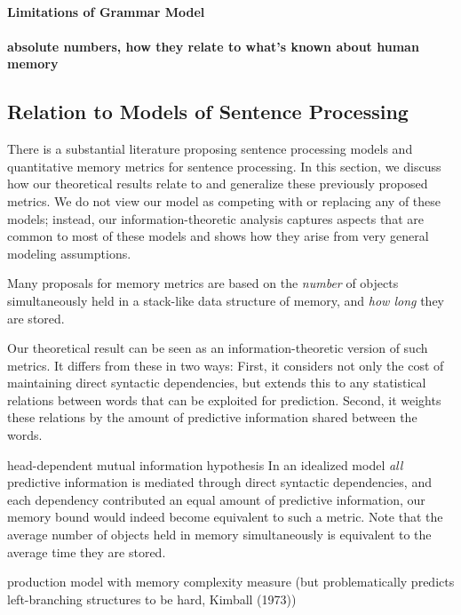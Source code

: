 \paragraph{Limitations of Grammar Model}

\paragraph{absolute numbers, how they relate to what's known about human memory}

\subsection{Relation to Models of Sentence Processing}

There is a substantial literature proposing sentence processing models and quantitative memory metrics for sentence processing.
In this section, we discuss how our theoretical results relate to and generalize these previously proposed metrics.
We do not view our model as competing with or replacing any of these models; instead, our information-theoretic analysis captures aspects that are common to most of these models and shows how they arise from very general modeling assumptions.

Many proposals for memory metrics are based on the \emph{number} of objects simultaneously held in a stack-like data structure of memory, and \emph{how long} they are stored.

Our theoretical result can be seen as an information-theoretic version of such metrics.
It differs from these in two ways:
First, it considers not only the cost of maintaining direct syntactic dependencies, but extends this to any statistical relations between words that can be exploited for prediction.
Second, it weights these relations by the amount of predictive information shared between the words.

head-dependent mutual information hypothesis
In an idealized model \emph{all} predictive information is mediated through direct syntactic dependencies, and each dependency contributed an equal amount of predictive information, our memory bound would indeed become equivalent to such a metric.
Note that the average number of objects held in memory simultaneously is equivalent to the average time they are stored.



\cite{yngve1960model} production model with memory complexity measure (but problematically predicts left-branching structures to be hard, Kimball (1973))

